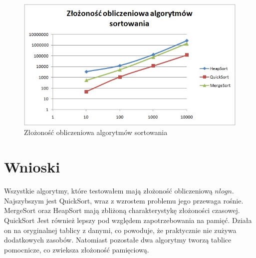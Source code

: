 \documentclass[12pt,oneside]{mwbk}
\begin{document}
	\begin{figure}[!h]
	\centering
	\includegraphics[scale=0.6]{rys/zlozonosc.jpg}
	\caption{Złożoność obliczeniowa algorytmów sortowania}
	\end{figure}

\section{Wnioski}
\indent Wszystkie algorytmy, które testowałem mają złożoność obliczeniową $nlogn$. Najszybszym jest QuickSort, wraz z wzrostem problemu jego przewaga rośnie. MergeSort oraz HeapSort mają zbliżoną charakterystykę złożoności czasowej. 
\indent QuickSort Jest również lepszy pod względem zapotrzebowania na pamięć. Działa on na oryginalnej tablicy z danymi, co powoduje, że praktycznie nie zużywa dodatkowych zasobów. Natomiast pozostałe dwa algorytmy tworzą tablice pomocnicze, co zwieksza złożoność pamięciową.
	
\end{document}
